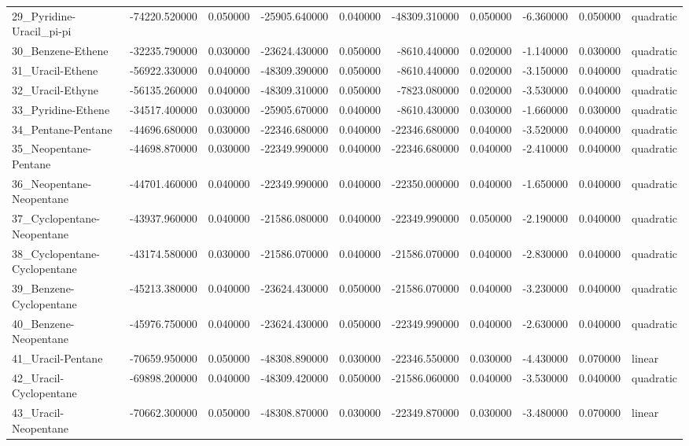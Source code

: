 \begin{tabular}{lrrrrrrrrl}
29_Pyridine-Uracil_pi-pi & -74220.520000 & 0.050000 & -25905.640000 & 0.040000 & -48309.310000 & 0.050000 & -6.360000 & 0.050000 & quadratic \\
30_Benzene-Ethene & -32235.790000 & 0.030000 & -23624.430000 & 0.050000 & -8610.440000 & 0.020000 & -1.140000 & 0.030000 & quadratic \\
31_Uracil-Ethene & -56922.330000 & 0.040000 & -48309.390000 & 0.050000 & -8610.440000 & 0.020000 & -3.150000 & 0.040000 & quadratic \\
32_Uracil-Ethyne & -56135.260000 & 0.040000 & -48309.310000 & 0.050000 & -7823.080000 & 0.020000 & -3.530000 & 0.040000 & quadratic \\
33_Pyridine-Ethene & -34517.400000 & 0.030000 & -25905.670000 & 0.040000 & -8610.430000 & 0.030000 & -1.660000 & 0.030000 & quadratic \\
34_Pentane-Pentane & -44696.680000 & 0.030000 & -22346.680000 & 0.040000 & -22346.680000 & 0.040000 & -3.520000 & 0.040000 & quadratic \\
35_Neopentane-Pentane & -44698.870000 & 0.030000 & -22349.990000 & 0.040000 & -22346.680000 & 0.040000 & -2.410000 & 0.040000 & quadratic \\
36_Neopentane-Neopentane & -44701.460000 & 0.040000 & -22349.990000 & 0.040000 & -22350.000000 & 0.040000 & -1.650000 & 0.040000 & quadratic \\
37_Cyclopentane-Neopentane & -43937.960000 & 0.040000 & -21586.080000 & 0.040000 & -22349.990000 & 0.050000 & -2.190000 & 0.040000 & quadratic \\
38_Cyclopentane-Cyclopentane & -43174.580000 & 0.030000 & -21586.070000 & 0.040000 & -21586.070000 & 0.040000 & -2.830000 & 0.040000 & quadratic \\
39_Benzene-Cyclopentane & -45213.380000 & 0.040000 & -23624.430000 & 0.050000 & -21586.070000 & 0.040000 & -3.230000 & 0.040000 & quadratic \\
40_Benzene-Neopentane & -45976.750000 & 0.040000 & -23624.430000 & 0.050000 & -22349.990000 & 0.040000 & -2.630000 & 0.040000 & quadratic \\
41_Uracil-Pentane & -70659.950000 & 0.050000 & -48308.890000 & 0.030000 & -22346.550000 & 0.030000 & -4.430000 & 0.070000 & linear \\
42_Uracil-Cyclopentane & -69898.200000 & 0.040000 & -48309.420000 & 0.050000 & -21586.060000 & 0.040000 & -3.530000 & 0.040000 & quadratic \\
43_Uracil-Neopentane & -70662.300000 & 0.050000 & -48308.870000 & 0.030000 & -22349.870000 & 0.030000 & -3.480000 & 0.070000 & linear \\

\end{tabular}
